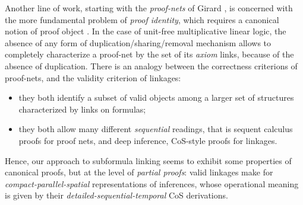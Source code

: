 Another line of work, starting with the \emph{proof-nets} of Girard
\cite{girard-linear-1987}, is concerned with the more fundamental problem of
\emph{proof identity}, which requires a canonical notion of proof object
\cite{strasburger-problem-2019}. In the case of unit-free multiplicative linear
logic, the absence of any form of duplication/sharing/removal mechanism allows
to completely characterize a proof-net by the set of its \emph{axiom}
links,
because of the absence of duplication.
There is an analogy between the correctness criterions of proof-nets, and the
validity criterion of linkages:
\begin{itemize}
  \item they both identify a subset of valid objects among a larger set of
  structures characterized by links on formulas;
  \item they both allow many different \emph{sequential} readings, that is
  sequent calculus proofs for proof nets, and deep inference, CoS-style proofs
  for linkages.
\end{itemize}
Hence, our approach to subformula linking seems to exhibit some properties of
canonical proofs, but at the level of \emph{partial proofs}: valid linkages make
for \emph{compact-parallel-spatial} representations of inferences, whose
operational meaning is given by their \emph{detailed-sequential-temporal} CoS
derivations.


